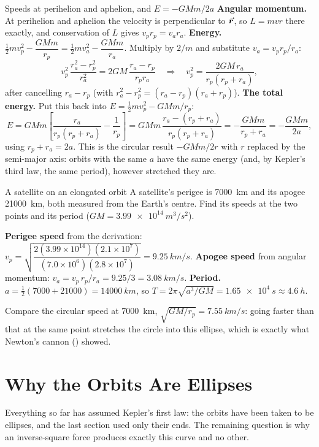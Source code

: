 \begin{derivbox}{Speeds at perihelion and aphelion, and $E=-GMm/2a$}
 \textbf{Angular momentum.} At perihelion and aphelion the velocity is perpendicular to $\vec{\bm{r}}$,
so $L=mvr$ there exactly, and conservation of $L$ gives $v_pr_p=v_ar_a$.
 \textbf{Energy.} $\tfrac12mv_p^2-\dfrac{GMm}{r_p}=\tfrac12mv_a^2-\dfrac{GMm}{r_a}$. Multiply by $2/m$
and substitute $v_a=v_pr_p/r_a$:
\[
v_p^2\,\frac{r_a^2-r_p^2}{r_a^2}=2GM\,\frac{r_a-r_p}{r_pr_a}
\quad\Longrightarrow\quad
v_p^2=\frac{2GM\,r_a}{r_p(r_p+r_a)},
\]
after cancelling $r_a-r_p$ (with $r_a^2-r_p^2=(r_a-r_p)(r_a+r_p)$).
 \textbf{The total energy.} Put this back into $E=\tfrac12mv_p^2-GMm/r_p$:
\[
E=GMm\left[\frac{r_a}{r_p(r_p+r_a)}-\frac{1}{r_p}\right]=GMm\,\frac{r_a-(r_p+r_a)}{r_p(r_p+r_a)}=-\frac{GMm}{r_p+r_a}=-\frac{GMm}{2a},
\]
using $r_p+r_a=2a$. This is the circular result $-GMm/2r$ with $r$ replaced by the semi-major axis: orbits with the same $a$
have the same energy (and, by Kepler's third law, the same period), however stretched they are.
\end{derivbox}

\begin{exbox}{A satellite on an elongated orbit}
A satellite's perigee is \SI{7000}{km} and its apogee \SI{21000}{km}, both measured from the Earth's
centre. Find its speeds at the two points and its period ($GM=\SI{3.99e14}{m^3/s^2}$).

 \textbf{Perigee speed} from the derivation:
$v_p=\sqrt{\dfrac{2(3.99\times10^{14})(2.1\times10^{7})}{(7.0\times10^{6})(2.8\times10^{7})}}=\SI{9.25}{km/s}$.
 \textbf{Apogee speed} from angular momentum: $v_a=v_p\,r_p/r_a=9.25/3=\SI{3.08}{km/s}$.
 \textbf{Period.} $a=\tfrac12(7000+21000)=\SI{14000}{km}$, so
$T=2\pi\sqrt{a^3/GM}=\SI{1.65e4}{s}\approx\SI{4.6}{h}$.

Compare the circular speed at \SI{7000}{km}, $\sqrt{GM/r_p}=\SI{7.55}{km/s}$: going faster than that at
the same point stretches the circle into this ellipse, which is exactly what Newton's cannon
() showed. 
\end{exbox}

\section{Why the Orbits Are Ellipses}\label{sec:ellipse}

Everything so far has assumed Kepler's first law: the orbits have been taken to be ellipses, and the
last section used only their ends. The remaining question is why an inverse-square force produces
exactly this curve and no other.

